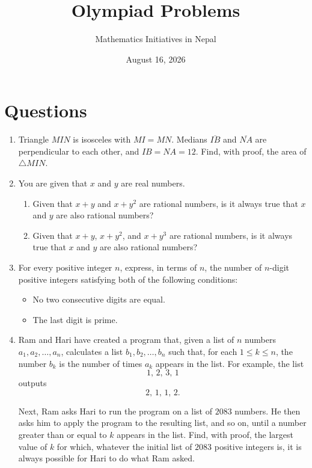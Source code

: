\documentclass{article}
\title{Olympiad Problems}
\author{Mathematics Initiatives in Nepal}
\date{August 16, 2026}
\begin{document}
\maketitle

\section{Questions}

\begin{enumerate}

\item Triangle $MIN$ is isosceles with $MI = MN$. Medians $\overline{IB}$ and
$\overline{NA}$ are perpendicular to each other, and $IB = NA = 12$.
Find, with proof, the area of $\triangle MIN$.

\medskip

\item You are given that $x$ and $y$ are real numbers.

\begin{enumerate}
    \item Given that $x+y$ and $x+y^2$ are rational numbers, is it always
    true that $x$ and $y$ are also rational numbers?

    \item Given that $x+y$, $x+y^2$, and $x+y^3$ are rational numbers,
    is it always true that $x$ and $y$ are also rational numbers?
\end{enumerate}

\medskip

\item For every positive integer $n$, express, in terms of $n$, the number
of $n$-digit positive integers satisfying both of the following conditions:

\begin{itemize}
    \item No two consecutive digits are equal.
    \item The last digit is prime.
\end{itemize}

\medskip

\item Ram and Hari have created a program that,
given a list of $n$ numbers
$a_1, a_2, \dots, a_n$,
calculates a list
$b_1, b_2, \dots, b_n$
such that, for each $1 \le k \le n$, the number $b_k$ is the number of
times $a_k$ appears in the list. For example, the list
\[
1, \,2, \,3, \,1
\]
outputs
\[
2,\,1,\,1,\,2.
\]

Next, Ram asks Hari to run the program on a list of $2083$ numbers. He then
asks him to apply the program to the resulting list, and so on, until a
number greater than or equal to $k$ appears in the list. Find, with proof,
the largest value of $k$ for which, whatever the initial list of $2083$
positive integers is, it is always possible for Hari to do what Ram asked.

\end{enumerate}
\end{document}
